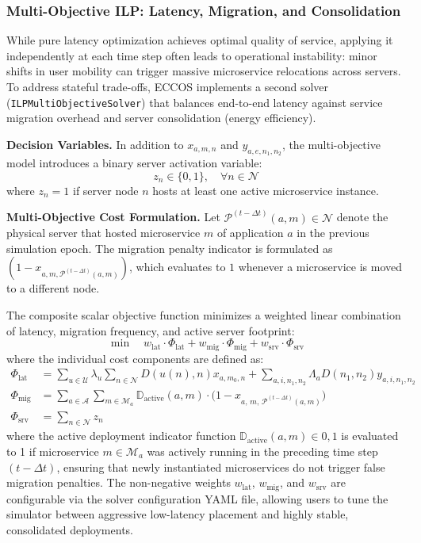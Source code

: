 \documentclass[ASNA]{USG} %
\begin{document}
\subsubsection{Multi-Objective ILP: Latency, Migration, and Consolidation}
\label{subsec:ilp_multi}

While pure latency optimization achieves optimal quality of service, applying it independently at each time step often leads to operational instability: minor shifts in user mobility can trigger massive microservice relocations across servers. To address stateful trade-offs, \textsc{ECCOS} implements a second solver (\texttt{ILPMultiObjectiveSolver}) that balances end-to-end latency against service migration overhead and server consolidation (energy efficiency).

\textbf{Decision Variables.} In addition to $x_{a,m,n}$ and $y_{a,e,n_1,n_2}$, the multi-objective model introduces a binary server activation variable:
\begin{equation}
z_n \in \{0, 1\}, \quad \forall n \in \mathcal{N}
\end{equation}
where $z_n = 1$ if server node $n$ hosts at least one active microservice instance.

\textbf{Multi-Objective Cost Formulation.} Let $\mathcal{P}^{(t-\Delta t)}(a,m) \in \mathcal{N}$ denote the physical server that hosted microservice $m$ of application $a$ in the previous simulation epoch. The migration penalty indicator is formulated as $(1 - x_{a,m,\mathcal{P}^{(t-\Delta t)}(a,m)})$, which evaluates to $1$ whenever a microservice is moved to a different node.

The composite scalar objective function minimizes a weighted linear combination of latency, migration frequency, and active server footprint:
\begin{equation}
\min \quad w_{\text{lat}} \cdot \Phi_{\text{lat}} + w_{\text{mig}} \cdot \Phi_{\text{mig}} + w_{\text{srv}} \cdot \Phi_{\text{srv}}
\end{equation}
where the individual cost components are defined as:
\begin{align}
\Phi_{\text{lat}} &= \sum_{u \in \mathcal{U}} \lambda_u \sum_{n \in \mathcal{N}} D(u(n), n) x_{a,m_0,n} + \sum_{a,i,n_1,n_2} \Lambda_a D(n_1,n_2) y_{a,i,n_1,n_2} \\
\Phi_{\text{mig}} &= \sum_{a \in \mathcal{A}} \sum_{m \in \mathcal{M}_a} \mathbb{D}_{\text{active}}(a,m) \cdot \Big( 1 - x_{a, \, m, \, \mathcal{P}^{(t-\Delta t)}(a,m)} \Big) \\
\Phi_{\text{srv}} &= \sum_{n \in \mathcal{N}} z_n
\end{align}
where the active deployment indicator function $\mathbb{D}_{\text{active}}(a,m) \in {0, 1}$ is evaluated to 1 if microservice $m \in \mathcal{M}_a$ was actively running in the preceding time step $(t-\Delta t)$, ensuring that newly instantiated microservices do not trigger false migration penalties.
The non-negative weights $w_{\text{lat}}$, $w_{\text{mig}}$, and $w_{\text{srv}}$ are configurable via the solver configuration YAML file, allowing users to tune the simulator between aggressive low-latency placement and highly stable, consolidated deployments.
\end{document}
